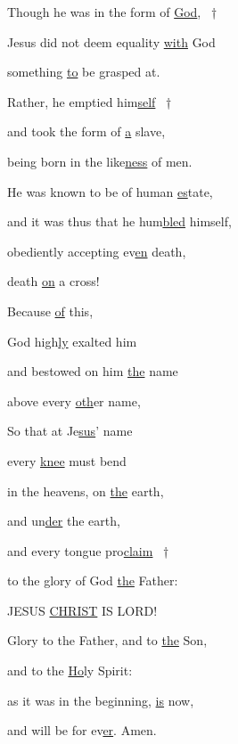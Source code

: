 \noindent Though he was in the form of \uline{God}, ~†~\nopagebreak

Jesus did not deem equality \uline{with} God ~\GreStar{}~\nopagebreak

something \uline{to} be grasped at.

\noindent Rather, he emptied him\uline{self} ~†~\nopagebreak

and took the form of \uline{a} slave, ~\GreStar{}~\nopagebreak

being born in the like\uline{ness} of men.

\noindent He was known to be of human \uline{es}tate, ~\GreStar{}~\nopagebreak

and it was thus that he hum\uline{bled} himself,

\noindent obediently accepting ev\uline{en} death, ~\GreStar{}~\nopagebreak

death \uline{on} a cross!

\noindent Because \uline{of} this, ~\GreStar{}~\nopagebreak

God high\uline{ly} exalted him

\noindent and bestowed on him \uline{the} name ~\GreStar{}~\nopagebreak

above every \uline{oth}er name,

\noindent So that at Je\uline{sus}’ name~\GreStar{}~\nopagebreak

every \uline{knee} must bend

\noindent in the heavens, on \uline{the} earth, ~\GreStar{}~\nopagebreak

and un\uline{der} the earth,

\noindent and every tongue pro\uline{claim} ~†~\nopagebreak

to the glory of God \uline{the} Father: ~\GreStar{}~\nopagebreak

JESUS \uline{CHRIST} IS LORD!

\noindent Glory to the Father, and to \uline{the} Son,~\GreStar{}~\nopagebreak

and to the \uline{Ho}ly Spirit:

\noindent as it was in the beginning, \uline{is} now,~\GreStar{}~\nopagebreak

and will be for ev\uline{er}. Amen.
